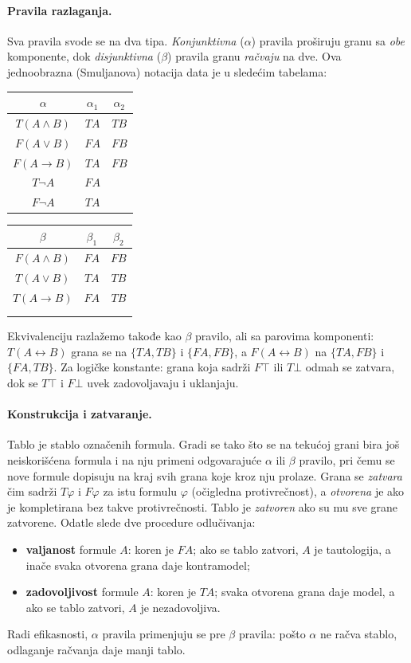 \documentclass[a4paper,10pt]{article}
\begin{document}
\paragraph{Pravila razlaganja.}
Sva pravila svode se na dva tipa. \emph{Konjunktivna} ($\alpha$) pravila
proširuju granu sa \emph{obe} komponente, dok \emph{disjunktivna} ($\beta$)
pravila granu \emph{račvaju} na dve. Ova jednoobrazna (Smuljanova) notacija
data je u sledećim tabelama:
\begin{center}
\begin{tabular}{c|cc}
$\alpha$ & $\alpha_1$ & $\alpha_2$ \\ \hline
$T(A \wedge B)$ & $TA$ & $TB$ \\
$F(A \vee B)$ & $FA$ & $FB$ \\
$F(A \rightarrow B)$ & $TA$ & $FB$ \\
$T\neg A$ & $FA$ & \\
$F\neg A$ & $TA$ & \\
\end{tabular}
\qquad
\begin{tabular}{c|cc}
$\beta$ & $\beta_1$ & $\beta_2$ \\ \hline
$F(A \wedge B)$ & $FA$ & $FB$ \\
$T(A \vee B)$ & $TA$ & $TB$ \\
$T(A \rightarrow B)$ & $FA$ & $TB$ \\
& & \\
& & \\
\end{tabular}
\end{center}
Ekvivalenciju razlažemo takođe kao $\beta$ pravilo, ali sa parovima komponenti:
$T(A \leftrightarrow B)$ grana se na $\{TA, TB\}$ i $\{FA, FB\}$, a
$F(A \leftrightarrow B)$ na $\{TA, FB\}$ i $\{FA, TB\}$. Za logičke konstante:
grana koja sadrži $F\top$ ili $T\bot$ odmah se zatvara, dok se $T\top$ i $F\bot$
uvek zadovoljavaju i uklanjaju.

\paragraph{Konstrukcija i zatvaranje.}
Tablo je stablo označenih formula. Gradi se tako što se na tekućoj grani bira
još neiskorišćena formula i na nju primeni odgovarajuće $\alpha$ ili $\beta$
pravilo, pri čemu se nove formule dopisuju na kraj svih grana koje kroz nju
prolaze. Grana se \emph{zatvara} čim sadrži $T\varphi$ i $F\varphi$ za istu
formulu $\varphi$ (očigledna protivrečnost), a \emph{otvorena} je ako je
kompletirana bez takve protivrečnosti. Tablo je \emph{zatvoren} ako su mu sve
grane zatvorene. Odatle slede dve procedure odlučivanja:
\begin{itemize}
 \item \textbf{valjanost} formule $A$: koren je $FA$; ako se tablo zatvori,
       $A$ je tautologija, a inače svaka otvorena grana daje kontramodel;
 \item \textbf{zadovoljivost} formule $A$: koren je $TA$; svaka otvorena grana
       daje model, a ako se tablo zatvori, $A$ je nezadovoljiva.
\end{itemize}
Radi efikasnosti, $\alpha$ pravila primenjuju se pre $\beta$ pravila: pošto
$\alpha$ ne račva stablo, odlaganje račvanja daje manji tablo.
\end{document}
